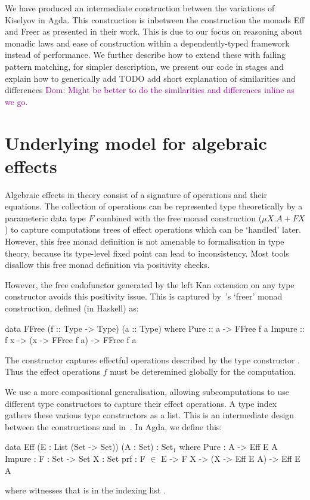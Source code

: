 \documentclass[preprint,sigplan]{acmart}
\newcommand{\dnote}[1]{\textcolor{purple}{Dom: #1}}
\begin{document}
We have produced an intermediate construction between the variations of Kiselyov in Agda.
This construction is inbetween the construction the monads Eff and Freer as presented in their work. This is due to our focus on reasoning about monadic laws and
ease of construction within a dependently-typed framework instead of performance.
We further describe how to extend these with failing pattern matching, for simpler description, we present our code in stages and explain how to generically add
TODO add short explanation of similarities and differences
\dnote{Might be better to do the similarities and differences inline
  as we go.}
\fi

\section{Underlying model for algebraic effects}
Algebraic effects in theory consist of a signature of operations and
their equations. The collection of operations can be represented
type theoretically by a parameteric data type $F$ combined with the free monad
construction ($\mu X . A + F X$) to capture computations trees of
effect operations which can be `handled' later. However, this free monad
 definition is not amenable to
formalisation in type theory, because its type-level fixed
point can lead to inconsistency. Most tools disallow this free
monad definition via positivity checks.

However, the free endofunctor generated by the left Kan extension
on any type constructor avoids this positivity issue. This
is captured by~\citet{freerm}'s `freer' monad construction, defined
(in Haskell) as:
\begin{haskell}
data FFree (f :: Type -> Type) (a :: Type) where
  Pure   :: a -> FFree f a
  Impure :: f x -> (x -> FFree f a) -> FFree f a
\end{haskell}
%
The  constructor captures effectful operations
described by the type constructor . Thus the
effect operations $f$ must be deteremined globally for the computation.

We use a more compositional generalisation, allowing
subcomputations to use different type constructors to capture their effect
operations. A type index gathers these various type constructors as a list.
This is an intermediate design between the constructions  and  in~\citet{freerm}.
In Agda, we define this:
%
\begin{agda}[mathescape]
data Eff (E : List (Set -> Set)) (A : Set) : Set$_1$ where
  Pure   : A -> Eff E A
  Impure : {F : Set -> Set} {X : Set} {prf : F $\in$ E}
        -> F X -> (X -> Eff E A) -> Eff E A
\end{agda}
%
where  witnesses that  is in the indexing list
.
\end{document}
